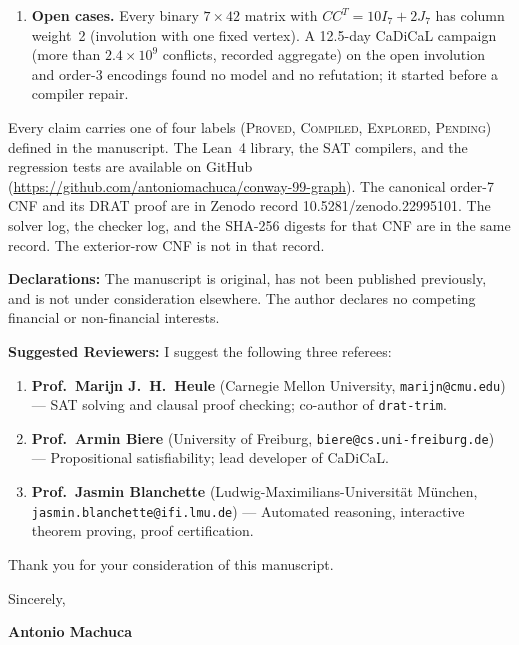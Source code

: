 \documentclass[10pt,a4paper]{article}
\begin{document}
\begin{enumerate}[leftmargin=1.5em, itemsep=0.75pt, topsep=0.75pt]
A separate file has four tests of the fixed-3 encoding.
The file is \texttt{tests/test\_z3\_fixed3\_encoding\_coverage.py}.
The four tests passed.
The four tests are \textsc{Compiled}.
The tests check 54 fixed one-factor entries.
The tests check the circulant adjacency literal.
The tests check 148 degree cardinalities.
The tests check 1520 common-neighbor pair orbits.
Those tests call no solver on the Conway fixed-3 formula.
\texttt{conway\_no\_z3\_fixed3\_automorphism} still contains \texttt{sorry}.
These tests do not cover the order-7 compiler.
These tests do not cover the fixed-point-free order-3 encoding.
Crnkovi{\'c} and Maksimovi{\'c} (2020) already exclude this fixed-point case.
These tests are not that exclusion.
  \item \textbf{Open cases.} Every binary $7\times 42$ matrix with $CC^T = 10I_7 + 2J_7$ has column weight~2 (involution with one fixed vertex). A 12.5-day CaDiCaL campaign (more than $2.4 \times 10^9$ conflicts, recorded aggregate) on the open involution and order-3 encodings found no model and no refutation; it started before a compiler repair.
\end{enumerate}

Every claim carries one of four labels (\textsc{Proved}, \textsc{Compiled}, \textsc{Explored}, \textsc{Pending}) defined in the manuscript. The Lean~4 library, the SAT compilers, and the regression tests are available on GitHub (\url{https://github.com/antoniomachuca/conway-99-graph}). The canonical order-7 CNF and its DRAT proof are in Zenodo record 10.5281/zenodo.22995101.
The solver log, the checker log, and the SHA-256 digests for that CNF are in the same record.
The exterior-row CNF is not in that record.

\textbf{Declarations:} The manuscript is original, has not been published previously, and is not under consideration elsewhere. The author declares no competing financial or non-financial interests.

\textbf{Suggested Reviewers:} I suggest the following three referees:
\begin{enumerate}[leftmargin=1.5em, itemsep=0.75pt, topsep=0.75pt]
  \item \textbf{Prof.~Marijn J.~H.~Heule} (Carnegie Mellon University, \texttt{marijn@cmu.edu}) --- SAT solving and clausal proof checking; co-author of \texttt{drat-trim}.
  \item \textbf{Prof.~Armin Biere} (University of Freiburg, \texttt{biere@cs.uni-freiburg.de}) --- Propositional satisfiability; lead developer of CaDiCaL.
  \item \textbf{Prof.~Jasmin Blanchette} (Ludwig-Maximilians-Universit{\"a}t M{\"u}nchen, \texttt{jasmin.blanchette@ifi.lmu.de}) --- Automated reasoning, interactive theorem proving, proof certification.
\end{enumerate}

Thank you for your consideration of this manuscript.

\vspace{0.5em}
Sincerely,

\vspace{0.3em}
\textbf{Antonio Machuca}
\end{document}
